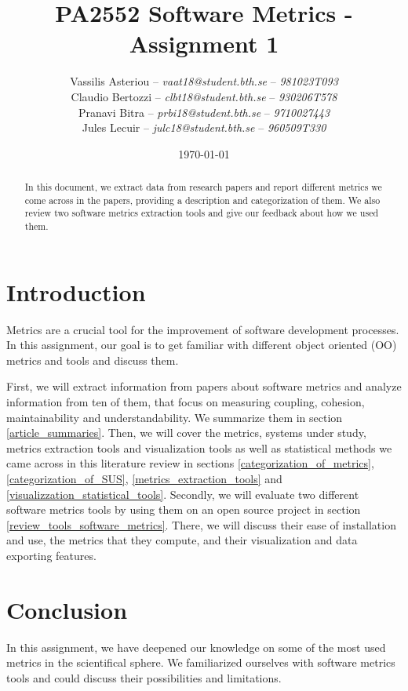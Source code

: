 \documentclass[a4paper, 10pt]{article}
\title{PA2552 Software Metrics - Assignment 1}
\author{
    Vassilis Asteriou -- \textit{vaat18@student.bth.se} -- \textit{981023T093}
    \\
    Claudio Bertozzi -- \textit{clbt18@student.bth.se} -- \textit{930206T578}
    \\
    Pranavi Bitra -- \textit{prbi18@student.bth.se} -- \textit{9710027443}
    \\
    Jules Lecuir -- \textit{julc18@student.bth.se} -- \textit{960509T330}
}
\date{\today}
\begin{document}
    \maketitle
    \begin{multicols}{2}
    
        \begin{abstract}
            In this document, we extract data from research papers and report different metrics we come across in the papers, providing a description and categorization of them. We also review two software metrics extraction tools and give our feedback about how we used them. 
        \end{abstract}
        
        \section{Introduction}
        
            Metrics are a crucial tool for the improvement of software development processes. In this assignment, our goal is to get familiar with different object oriented (OO) metrics and tools and discuss them. 
            
            First, we will extract information from papers about software metrics and analyze information from ten of them, that focus on measuring coupling, cohesion, maintainability and understandability. We summarize them in section \ref{article_summaries}. Then, we will cover the metrics, systems under study, metrics extraction tools and visualization tools as well as statistical methods we came across in this literature review in sections \ref{categorization_of_metrics}, \ref{categorization_of_SUS}, \ref{metrics_extraction_tools} and \ref{visualizzation_statistical_tools}. Secondly, we will evaluate two different software metrics tools by using them on an open source project in section \ref{review_tools_software_metrics}. There, we will discuss their ease of installation and use, the metrics that they compute, and their visualization and data exporting features.
            
        
        
        
    
        
        
        \section{Conclusion}
            
            In this assignment, we have deepened our knowledge on some of the most used metrics in the scientifical sphere. We familiarized ourselves with software metrics tools and could discuss their possibilities and limitations.
            
    \end{multicols}
    
    \clearpage
    \printbibliography
\end{document}
